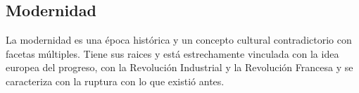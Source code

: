 \begin{comment}
* cultura/campo cultural y su rol en la formación de la nación
  * símbolos del Peronismo? (vgl auch marco histórico)
      * "Para la semiótica, la cultura es una red de signos; es un acto comunicativo, un intercambio"~\cite{SzIr2009}{p.71}
  * cultura de masas; imprenta; todo el mundo puede leer

Ya en los principios y mitad del siglo XX tenemos un auge inaudito de la cultura de masas que tiene que ver con el advance tecnológico..:
la producción de bienes culturales materiales es más accesible que nunca.

# campo cultural

* Bourdieu!
* segun Bourdieu: "un campo es un sistema de posiciones individuales (caracterizadas por el habitus de sus miembros) que se definen por la estructura y la cantidad del capital que se posee" ~\cite{SzIr2009}{p.48}
* un conjunto de límites, creencias y prácticas
* negocia las relaciones entre grupos: "La idea de campo permite estudiar ya no sólo las dinámicas de la cultura como bien de la élite, sino las dinámicas de las diferentes culturas que disputan la hegemonía"~\cite{SzIr2009}{p.48}
* lugar de conflicto y mecanismo de poder
* capital
  * económico - trabajo, tierras, patrimonios
  * cultural - conocimientos, calificaciones <- define las relaciones en el campo cultural
  * social - amigos, redes,
  * simbólico - reputación, prestigio

* cómo se tracen los límites del campo? quién decide?
* actores del campo cultural: "el intelectual" (nótase el artículo masculino), "el artista": quines son? cuál es su papel en la construcción de la nación?
* el poder/privilegio se han de ver en relación, no en vacuum (algunos pueden ser privilegiados en respeto a otr@s y menos privilegiad@s en respeto a un tercer grupo)
* "Las instituciones son la configuración de relaciones entre actores individuales y colectivos."~\cite{SzIr2009}{p.49}
\end{comment}


\subsection{Modernidad}

La modernidad es una época histórica y un concepto cultural contradictorio con facetas múltiples.
Tiene sus raices y está estrechamente vinculada con la idea europea del progreso, con la Revolución Industrial y la Revolución Francesa y se caracteriza con la ruptura con lo que existió antes.

